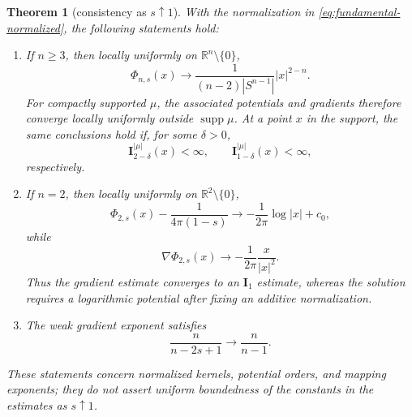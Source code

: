 \documentclass[reqno]{amsart}
\numberwithin{equation}{section}
\theoremstyle{plain}
\newtheorem{theorem}{Theorem}[section]
\theoremstyle{definition}
\theoremstyle{remark}
\newcommand{\R}{\mathbb R}
\newcommand{\I}{\mathbf I}
\begin{document}
\begin{theorem}[consistency as $s\uparrow1$]
\label{thm:s-to-one}
With the normalization in \eqref{eq:fundamental-normalized}, the following
statements hold:
\begin{enumerate}
\item If $n\ge3$, then locally uniformly on $\R^n\setminus\{0\}$,
\begin{equation}\label{eq:newton-limit}
 \Phi_{n,s}(x)\longrightarrow
 \frac{1}{(n-2)|S^{n-1}|}|x|^{2-n}.
\end{equation}
For compactly supported $\mu$, the associated potentials and gradients
therefore converge locally uniformly outside $\operatorname{supp}\mu$.
At a point $x$ in the support, the same conclusions hold if, for some
$\delta>0$,
\begin{equation}\label{eq:s-limit-dominating-potentials}
 \I_{2-\delta}^{|\mu|}(x)<\infty,
 \qquad \I_{1-\delta}^{|\mu|}(x)<\infty,
\end{equation}
respectively.
\item If $n=2$, then locally uniformly on $\R^2\setminus\{0\}$,
\begin{equation}\label{eq:log-limit}
 \Phi_{2,s}(x)-\frac{1}{4\pi(1-s)}
 \longrightarrow -\frac{1}{2\pi}\log|x|+c_0,
\end{equation}
while
\begin{equation}\label{eq:gradient-log-limit}
 \nabla\Phi_{2,s}(x)\longrightarrow
 -\frac{1}{2\pi}\frac{x}{|x|^2}.
\end{equation}
Thus the gradient estimate converges to an $\I_1$ estimate, whereas the
solution requires a logarithmic potential after fixing an additive
normalization.
\item The weak gradient exponent satisfies
\begin{equation}\label{eq:weak-exponent-limit}
 \frac{n}{n-2s+1}\longrightarrow\frac{n}{n-1}.
\end{equation}
\end{enumerate}
These statements concern normalized kernels, potential orders, and mapping
exponents; they do not assert uniform boundedness of the constants in the
estimates as $s\uparrow1$.
\end{theorem}
\end{document}
